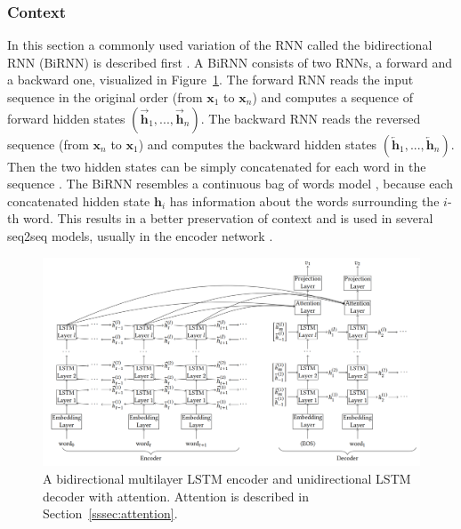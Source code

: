 \documentclass[12pt]{article}
\begin{document}
\subsubsection{Context} \label{sssec:context}
In this section a commonly used variation of the RNN called the bidirectional RNN (BiRNN) is described first \cite{Schuster:1997}. A BiRNN consists of two RNNs, a forward and a backward one, visualized in Figure~\ref{fig:context}. The forward RNN reads the input sequence in the original order (from \(\bm{x}_1\) to \(\bm{x}_n\)) and computes a sequence of forward hidden states \((\overrightarrow{\bm{h}}_1,...,\overrightarrow{\bm{h}}_n)\). The backward RNN reads the reversed sequence (from \(\bm{x}_n\) to \(\bm{x}_1\)) and computes the backward hidden states \((\overleftarrow{\bm{h}}_1,...,\overleftarrow{\bm{h}}_n)\). Then the two hidden states can be simply concatenated for each word in the sequence \cite{Bahdanau:2014,Zhaob:2017}. The BiRNN resembles a continuous bag of words model \cite{Mikolov:2013}, because each concatenated hidden state \(\bm{h}_i\) has information about the words surrounding the \(i\)-th word. This results in a better preservation of context and is used in several seq2seq models, usually in the encoder network \cite{Zhaob:2017,Xing_topic:2017,googleNMT:2016,Yin:2017}.
\begin{figure}[H]
	\centering
	\includegraphics[width=1.0\textwidth]{pics/bilstm.png}
	\caption{A bidirectional multilayer LSTM encoder and unidirectional LSTM decoder \cite{Yin:2017} with attention. Attention is described in Section~\ref{sssec:attention}.}
	\label{fig:context}
\end{figure}
\end{document}
